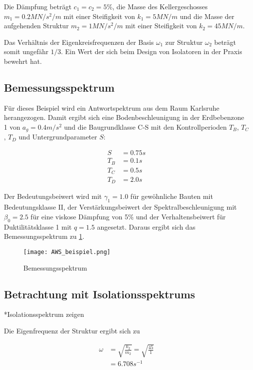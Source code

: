 Die Dämpfung beträgt $c_1 = c_2 = 5\%$, die Masse des Kellergeschosses $m_1 = 0.2 MN/s^2/m$ mit einer Steifigkeit von $k_1 = 5 MN/m$ und die Masse der aufgehenden Struktur $m_2 = 1 MN/s^2/m$ mit einer Steifigkeit von $k_2 = 45 MN/m$.

Das Verhältnis der Eigenkreisfrequenzen der Basis $\omega_1$ zur Struktur $\omega_2$ beträgt somit ungefähr $1/3$. Ein Wert der sich beim Design von Isolatoren in der Praxis bewehrt hat.

\subsection{Bemessungsspektrum}

Für dieses Beispiel wird ein Antwortspektrum aus dem Raum Karlsruhe herangezogen. Damit ergibt sich eine Bodenbeschleunigung in der Erdbebenzone 1 von $a_g = 0.4 m/s^2$ und die Baugrundklasse C-S mit den Kontrollperioden $T_B$, $T_C$, $T_D$ und Untergrundparameter $S$:

\begin{align*}
S &= 0.75 s\\
T_B &= 0.1 s\\
T_C &= 0.5 s\\
T_D &= 2.0 s
\end{align*}

Der Bedeutungsbeiwert wird mit $\gamma_1 = 1.0$ für gewöhnliche Bauten mit Bedeutungsklasse II, der Verstärkungsbeiwert der Spektralbeschleunigung mit $\beta_0 = 2.5$ für eine viskose Dämpfung von 5\% und der Verhaltensbeiwert für Duktilitätsklasse 1 mit $q = 1.5$ angesetzt.
Daraus ergibt sich das Bemessungsspektrum zu \cref{fig:Bemessungsspektrum}.

\begin{figure}[ht] 
    \centering
    \texttt{[image: AWS\_beispiel.png]}
    \caption{Bemessungsspektrum}
    \label{fig:Bemessungsspektrum}
\end{figure}

\subsection{Betrachtung mit Isolationsspektrums}

*Isolationsspektrum zeigen

Die Eigenfrequenz der Struktur ergibt sich zu

\begin{align*}
\omega &= \sqrt{\frac{k_2}{m_2}} = \sqrt{\frac{45}{1}}\\
       &= 6.708 s^{-1}
\end{align*}

